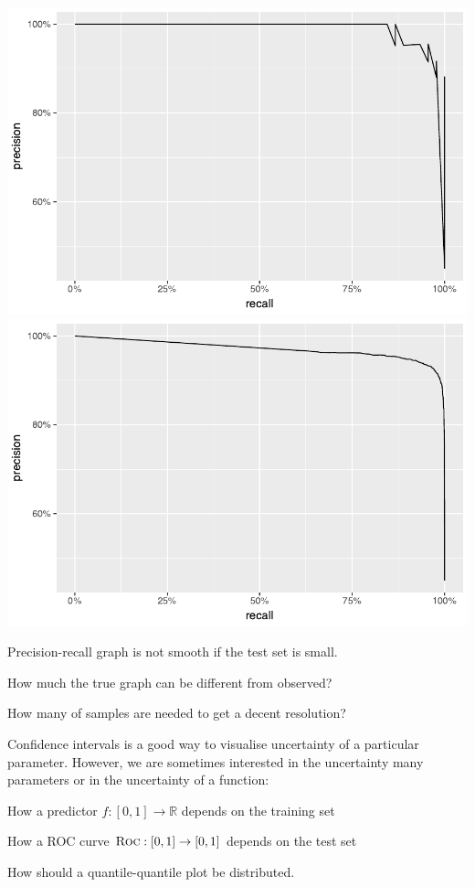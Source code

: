 \documentclass[landscape,footrule]{foils}
\begin{document}
\centerline{
\includegraphics[scale=0.7]{precision_recall_1B}\hspace*{0.5cm}
\includegraphics[scale=0.7]{precision_recall_1A}}
\vspace*{1cm}
\begin{triangles}
\item Precision-recall graph is not smooth if the test set is small.
\item How much the true graph can be different from observed?
\item How many of samples are needed to get a decent resolution?  
\end{triangles}



Confidence intervals is a good way to visualise uncertainty of a particular parameter.
However, we are sometimes interested in the uncertainty many parameters or in the uncertainty of a function:
\begin{triangles}
\item How a predictor $f:[0,1]\to\mathbb{R}$ depends on the training set
\item How a ROC curve $\textsc{Roc}:[0,1]\to[0,1]$ depends on the test set
\item How should a quantile-quantile plot be distributed.
\end{triangles}
\vspace*{4ex}
\end{document}
